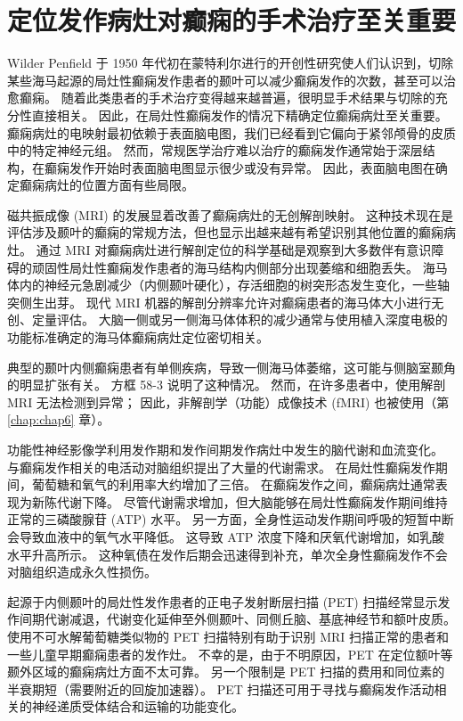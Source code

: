 \section{定位发作病灶对癫痫的手术治疗至关重要}

Wilder Penfield 于 1950 年代初在蒙特利尔进行的开创性研究使人们认识到，切除某些海马起源的局灶性癫痫发作患者的颞叶可以减少癫痫发作的次数，甚至可以治愈癫痫。
随着此类患者的手术治疗变得越来越普遍，很明显手术结果与切除的充分性直接相关。
因此，在局灶性癫痫发作的情况下精确定位癫痫病灶至关重要。
癫痫病灶的电映射最初依赖于表面脑电图，我们已经看到它偏向于紧邻颅骨的皮质中的特定神经元组。
然而，常规医学治疗难以治疗的癫痫发作通常始于深层结构，在癫痫发作开始时表面脑电图显示很少或没有异常。
因此，表面脑电图在确定癫痫病灶的位置方面有些局限。



磁共振成像 (MRI) 的发展显着改善了癫痫病灶的无创解剖映射。
这种技术现在是评估涉及颞叶的癫痫的常规方法，但也显示出越来越有希望识别其他位置的癫痫病灶。
通过 MRI 对癫痫病灶进行解剖定位的科学基础是观察到大多数伴有意识障碍的顽固性局灶性癫痫发作患者的海马结构内侧部分出现萎缩和细胞丢失。
海马体内的神经元急剧减少（内侧颞叶硬化），存活细胞的树突形态发生变化，一些轴突侧生出芽。
现代 MRI 机器的解剖分辨率允许对癫痫患者的海马体大小进行无创、定量评估。
大脑一侧或另一侧海马体体积的减少通常与使用植入深度电极的功能标准确定的海马体癫痫病灶定位密切相关。


典型的颞叶内侧癫痫患者有单侧疾病，导致一侧海马体萎缩，这可能与侧脑室颞角的明显扩张有关。
方框 58-3 说明了这种情况。
然而，在许多患者中，使用解剖 MRI 无法检测到异常；
因此，非解剖学（功能）成像技术 (fMRI) 也被使用（第 \ref{chap:chap6} 章）。


功能性神经影像学利用发作期和发作间期发作病灶中发生的脑代谢和血流变化。
与癫痫发作相关的电活动对脑组织提出了大量的代谢需求。
在局灶性癫痫发作期间，葡萄糖和氧气的利用率大约增加了三倍。
在癫痫发作之间，癫痫病灶通常表现为新陈代谢下降。
尽管代谢需求增加，但大脑能够在局灶性癫痫发作期间维持正常的三磷酸腺苷 (ATP) 水平。
另一方面，全身性运动发作期间呼吸的短暂中断会导致血液中的氧气水平降低。
这导致 ATP 浓度下降和厌氧代谢增加，如乳酸水平升高所示。
这种氧债在发作后期会迅速得到补充，单次全身性癫痫发作不会对脑组织造成永久性损伤。


起源于内侧颞叶的局灶性发作患者的正电子发射断层扫描 (PET) 扫描经常显示发作间期代谢减退，代谢变化延伸至外侧颞叶、同侧丘脑、基底神经节和额叶皮质。
使用不可水解葡萄糖类似物的 PET 扫描特别有助于识别 MRI 扫描正常的患者和一些儿童早期癫痫患者的发作灶。
不幸的是，由于不明原因，PET 在定位额叶等颞外区域的癫痫病灶方面不太可靠。
另一个限制是 PET 扫描的费用和同位素的半衰期短（需要附近的回旋加速器）。
PET 扫描还可用于寻找与癫痫发作活动相关的神经递质受体结合和运输的功能变化。


